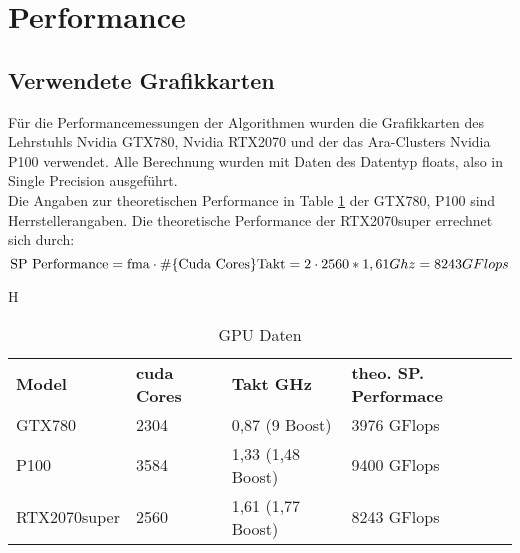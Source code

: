 \documentclass[10pt,a4paper]{article}
\begin{document}
	 \section{Performance}
	 \subsection{Verwendete Grafikkarten}
	 Für die Performancemessungen der Algorithmen wurden die Grafikkarten des Lehrstuhls Nvidia GTX780, Nvidia RTX2070 und der das Ara-Clusters Nvidia P100 verwendet. Alle Berechnung wurden mit Daten des Datentyp floats, also in Single Precision ausgeführt.\\
	 Die Angaben zur theoretischen Performance in Table \ref{GPU Daten} der GTX780, P100 sind Herrstellerangaben. Die theoretische Performance der RTX2070super errechnet sich durch: $$\text{SP Performance}= \text{fma}\cdot \# \{\text{Cuda Cores}\} \text{Takt}\\
	 =2\cdot 2560*1,61 Ghz\\
	 =8243 GFlops$$
	 \begin{table}{H}
	 	\centering
	 	\begin{tabular}{llll}
	 		\textbf{Model}  & \textbf{cuda Cores} & \textbf{Takt GHz}  & \textbf{theo. SP. Performace} &\\
	 		GTX780           & 2304       & 0,87 (9 Boost) & 3976 GFlops   \\
	 		P100       & 3584 & 1,33 (1,48 Boost) &9400     GFlops        \\
	 		RTX2070super        & 2560 & 1,61 (1,77 Boost) &   8243 GFlops         \\
	 	\end{tabular}
	 	
	 	\caption{GPU Daten}
	 	\label{GPU Daten}
	 	
	 \end{table}
\end{document}
